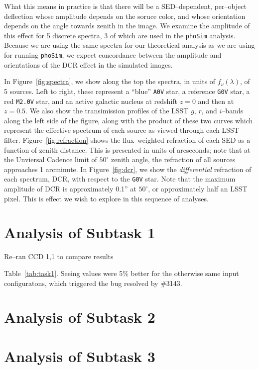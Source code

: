 \documentclass[prd, nofootinbib, floatfix, 11pt, tightenlines, times]{article}
\begin{document}
What this means in practice is that there will be a SED--dependent,
per--object deflection whose amplitude depends on the soruce color,
and whose orientation depends on the angle towards zenith in the
image.  We examine the amplitude of this effect for 5 discrete
spectra, 3 of which are used in the {\tt phoSim} analysis.  Because we
are using the same spectra for our theoretical analysis as we are
using for running {\tt phoSim}, we expect concordance between the
amplitude and orientations of the DCR effect in the simulated images.

In Figure~\ref{fig:spectra}, we show along the top the spectra, in
units of $f_\nu(\lambda)$, of 5 sources.  Left to right, these
represent a ``blue'' {\tt A0V} star, a reference {\tt G0V} star, a red
{\tt M2.0V} star, and an active galactic nucleus at redshift $z=0$ and
then at $z=0.5$.  We also show the transimission profiles of the LSST
$g$, $r$, and $i$--bands along the left side of the figure, along with
the product of these two curves which represent the effective spectrum
of each source as viewed through each LSST filter.
Figure~\ref{fig:refraction} shows the flux--weighted refraction of
each SED as a function of zenith distance.  This is presented in units
of arcseconds; note that at the Unviersal Cadence limit of
$50^{\circ}$ zenith angle, the refraction of all sources approaches 1
arcminute.  In Figure~\ref{fig:dcr}, we show the {\it differential}
refraction of each spectrum, DCR, with respect to the {\tt G0V} star.
Note that the maximum amplitude of DCR is approximately 0.1'' at
$50^{\circ}$, or approximately half an LSST pixel.  This is effect we
wish to explore in this sequence of analyses.

\section{Analysis of Subtask 1 \label{sec:task1}}

Re--ran CCD 1,1 to compare results

Table~\ref{tab:task1}.  Seeing values were 5\% better for the
otherwise same input configuratons, which triggered the bug resolved
by \#3143.

\section{Analysis of Subtask 2 \label{sec:task2}}

\section{Analysis of Subtask 3 \label{sec:task3}}
\end{document}
